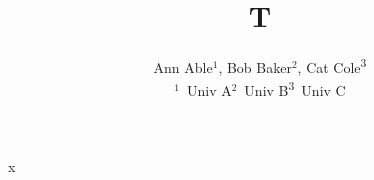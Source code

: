 \documentclass{article}
\begin{document}
\title{T}
\author{Ann Able$^{1}$, Bob Baker$^{2}$, Cat Cole\textsuperscript{3}\\
$^1$~Univ A\quad$^2$~Univ B\quad\textsuperscript{3}\ Univ C}
\maketitle
x
\end{document}

